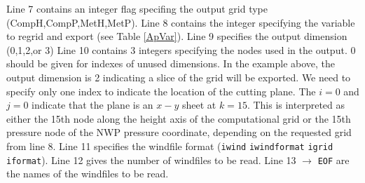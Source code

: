 \documentclass[11pt]{article}   %
\begin{document}
Line 7 contains an integer flag specifing the output grid type (CompH,CompP,MetH,MetP).
Line 8 contains the integer specifying the variable to regrid and export (see Table \ref{ApVar}).
Line 9 specifies the output dimension (0,1,2,or 3)
Line 10 contains 3 integers specifying the nodes used in the output. 0 should be given for indexes of unused
dimensions.  In the example above, the output dimension is 2 indicating a slice of the grid will be
exported.  We need to specify only one index to indicate the location of the cutting plane.  The $i=0$
and $j=0$ indicate that the plane is an $x-y$ sheet at $k=15$.  This is interpreted as either the 15th node
along the height axis of the computational grid or the 15th pressure node of the NWP pressure coordinate,
depending on the requested grid from line 8.
Line 11 specifies the windfile format (\texttt{iwind} \texttt{iwindformat} \texttt{igrid} \texttt{iformat}).
Line 12 gives the number of windfiles to be read.
Line 13 $\rightarrow$ \texttt{EOF} are the names of the windfiles to be read.
\end{document}
